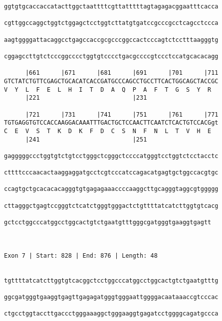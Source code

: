 \documentclass{article}
\begin{document}
\begin{Verbatim}
ggtgtgcaccaccatacttggctaattttcgttatttttagtagagacggaatttcacca
                                                            
cgttggccaggctggtctggagctcctggtcttatgtgatccgcccgcctcagcctccca
                                                            
aagtggggattacaggcctgagccaccgcgcccggccactcccagtctcctttaagggtg
                                                            
cggagccttgtctcccggcccctggtgtcccctgacgccccgtccctccatgcacacagg
                                                            
      |661      |671      |681      |691      |701      |711
GTCTATCTGTTCGAGCTGCACATCACCGATGCCCAGCCTGCCTTCACTGGCAGCTACCGC
V  Y  L  F  E  L  H  I  T  D  A  Q  P  A  F  T  G  S  Y  R  
      |221                          |231                    
  
      |721      |731      |741      |751      |761      |771
TGTGAGGTGTCCACCAAGGACAAATTTGACTGCTCCAACTTCAATCTCACTGTCCACGgt
C  E  V  S  T  K  D  K  F  D  C  S  N  F  N  L  T  V  H  E  
      |241                          |251                    
  
gagggggccctggtgtctgtcctgggctcgggctccccatgggtcctggtctcctacctc
                                                            
cttttcccaacactaaggaggatgcctcgtcccatccagacatgagtgctggccacgtgc
                                                            
ccagtgctgcacacacagggtgtgagagaaaccccaaggcttgcagggtaggcgtggggg
                                                            
cttagggctgagtccgggtctcatctgggtgggactctgttttatcatcttggtgtcacg
                                                            
gctcctggcccatggcctggcactgtctgaatgtttgggcgatgggtgaaggtgagtt
                                                          
                                                          
 
Exon 7 | Start: 828 | End: 876 | Length: 48


tgttttatcatcttggtgtcacggctcctggcccatggcctggcactgtctgaatgtttg
                                                            
ggcgatgggtgaaggtgagttgagagatgggtgggaattggggacaataaaccgtcccac
                                                            
ctgcctggtaccttgaccctgggaaaggctgggaaggtgagatcctggggcagatgccca
                                                            

\end{Verbatim}
\end{document}
